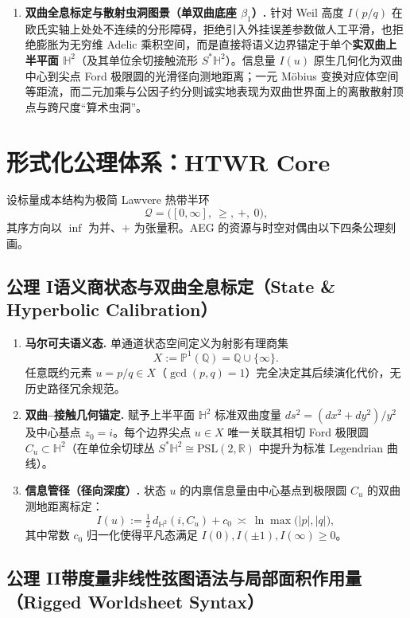 \documentclass[11pt,a4paper]{ctexart}
\theoremstyle{plain}
\theoremstyle{definition}
\newcommand{\HH}{\mathbb{H}}
\newcommand{\PP}{\mathbb{P}}
\newcommand{\QQ}{\mathbb{Q}}
\newcommand{\cQ}{\mathcal{Q}}
\newcommand{\PSL}{\mathrm{PSL}}
\newcommand{\abs}[1]{\lvert #1 \rvert}
\begin{document}
\begin{enumerate}
\item \textbf{双曲全息标定与散射虫洞图景（单双曲底座 $\beta_1$）.}
针对 Weil 高度 $I(p/q)$ 在欧氏实轴上处处不连续的分形障碍，拒绝引入外挂误差参数做人工平滑，也拒绝膨胀为无穷维 Adelic 乘积空间，而是直接将语义边界锚定于单个\textbf{实双曲上半平面 $\HH^2$}（及其单位余切接触流形 $S^*\HH^2$）。信息量 $I(u)$ 原生几何化为双曲中心到尖点 Ford 极限圆的光滑径向测地距离；一元 Möbius 变换对应体空间等距流，而二元加乘与公因子约分则诚实地表现为双曲世界面上的离散散射顶点与跨尺度“算术虫洞”。
\end{enumerate}

\section{形式化公理体系：HTWR Core}

设标量成本结构为极简 Lawvere 热带半环
\[
\cQ = \bigl([0, \infty],\ \ge,\ +,\ 0\bigr),
\]
其序方向以 $\inf$ 为并、$+$ 为张量积。AEG 的资源与时空对偶由以下四条公理刻画。

\subsection*{公理 I\quad 语义商状态与双曲全息标定（State \& Hyperbolic Calibration）}

\begin{enumerate}
\item \textbf{马尔可夫语义态.} 单通道状态空间定义为射影有理商集
\[
X := \PP^1(\QQ) = \QQ \cup \{\infty\}.
\]
任意既约元素 $u = p/q \in X$（$\gcd(p,q)=1$）完全决定其后续演化代价，无历史路径冗余规范。

\item \textbf{双曲--接触几何锚定.} 赋予上半平面 $\HH^2$ 标准双曲度量 $ds^2 = (dx^2 + dy^2)/y^2$ 及中心基点 $z_0 = i$。每个边界尖点 $u \in X$ 唯一关联其相切 Ford 极限圆 $C_u \subset \HH^2$（在单位余切球丛 $S^*\HH^2 \cong \PSL(2, \mathbb{R})$ 中提升为标准 Legendrian 曲线）。

\item \textbf{信息管径（径向深度）.} 状态 $u$ 的内禀信息量由中心基点到极限圆 $C_u$ 的双曲测地距离标定：
\[
I(u) := \tfrac{1}{2}\, d_{\HH^2}(i, C_u) + c_0 \ \asymp\ \ln \max\bigl(\abs{p}, \abs{q}\bigr),
\]
其中常数 $c_0$ 归一化使得平凡态满足 $I(0), I(\pm 1), I(\infty) \ge 0$。
\end{enumerate}

\subsection*{公理 II\quad 带度量非线性弦图语法与局部面积作用量（Rigged Worldsheet Syntax）}
\end{document}
